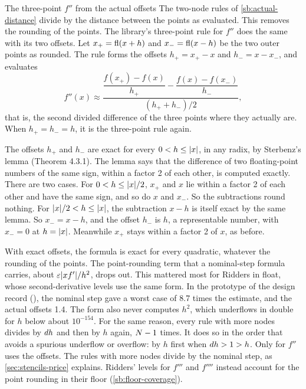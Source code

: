 \begin{sidebar}[label=sb:actual-offsets]{The three-point $f''$ from the actual offsets}
The two-node rules of \cref{sb:actual-distance} divide by the distance between the points as evaluated. This
removes the rounding of the points. The library's three-point rule for $f''$ does the same with its two offsets. Let
$x_+ = \operatorname{fl}(x + h)$ and $x_- = \operatorname{fl}(x - h)$ be the two outer points as rounded. The rule forms the offsets
$h_+ = x_+ - x$ and $h_- = x - x_-$, and evaluates
\[
  f''(x) \approx \frac{\dfrac{f(x_+) - f(x)}{h_+} - \dfrac{f(x) - f(x_-)}{h_-}}{(h_+ + h_-) / 2},
\]
that is, the second divided difference of the three points where they actually are. When $h_+ = h_- = h$, it is the
three-point rule again.

The offsets $h_+$ and $h_-$ are exact for every $0 < h \le \lvert x \rvert$, in any radix, by Sterbenz's lemma
(Theorem 4.3.1).\cite{sterbenz1974} The lemma says that the difference of two floating-point numbers of the same sign,
within a factor 2 of each other, is computed exactly. There are two cases. For $0 < h \le \lvert x \rvert / 2$, $x_+$ and
$x$ lie within a factor 2 of each other and have the same sign, and so do $x$ and $x_-$. So the subtractions round
nothing. For $\lvert x \rvert / 2 < h \le \lvert x \rvert$, the subtraction $x - h$ is itself exact by the same lemma. So
$x_- = x - h$, and the offset $h_-$ is $h$, a representable number, with $x_- = 0$ at $h = \lvert x \rvert$. Meanwhile $x_+$
stays within a factor 2 of $x$, as before.

With exact offsets, the formula is exact for every quadratic, whatever the rounding of the points. The point-rounding
term that a nominal-step formula carries, about $\varepsilon \lvert x f' \rvert / h^2$, drops out. This mattered most for
Ridders in float, whose second-derivative levels use the same form. In the prototype of the design record
(), the nominal step gave a worst case of 8.7 times the estimate, and the actual
offsets 1.4. The form also never computes $h^2$, which underflows in double for $h$ below about $10^{-154}$. For the
same reason, every rule with more nodes divides by $d h$ and then by $h$ again, $N - 1$ times. It does so in
the order that avoids a spurious underflow or overflow: by $h$ first when $d h > 1 > h$. Only  for
$f''$ uses the offsets. The rules with more nodes divide by the nominal step, as \cref{sec:stencils-price} explains.
Ridders' levels for $f'''$ and $f''''$ instead account for the point rounding in their floor
(\cref{sb:floor-coverage}).
\end{sidebar}
